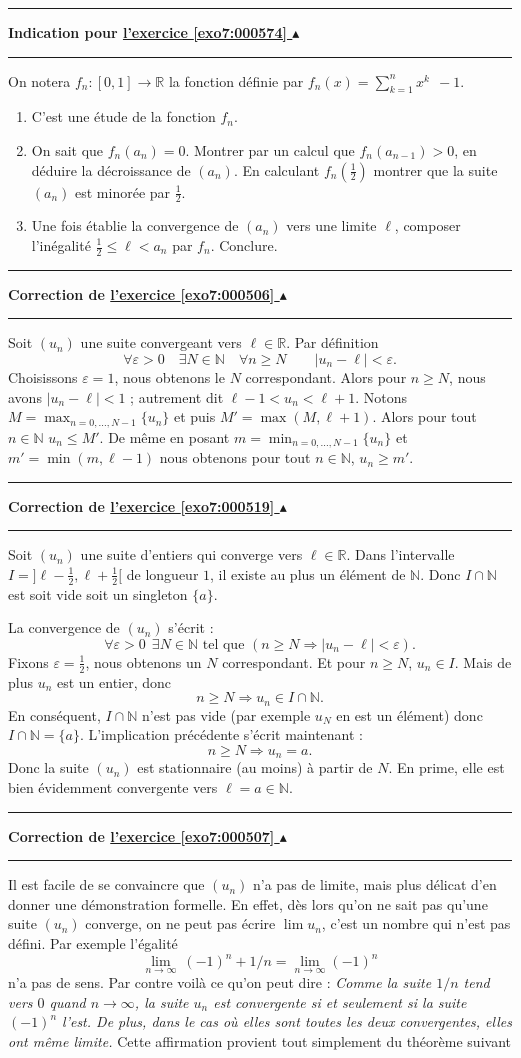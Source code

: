 \documentclass[11pt,a4paper]{article}
\newcommand{\Nn}{\mathbb{N}} \newcommand{\N}{\mathbb{N}}
\newcommand{\Rr}{\mathbb{R}} \newcommand{\R}{\mathbb{R}}
\renewcommand{\epsilon}{\varepsilon}
\newcounter{exo}
\newcommand{\indication}[1]{\hypertarget{ind7:#1}{}\label{ind7:#1}{\bf Indication pour \hyperlink{exo7:#1}{l'exercice \ref{exo7:#1} $\blacktriangle$}}\vspace{1mm}\hrule\vspace{1mm}}
\newcommand{\finindication}{\vspace{1mm}\hrule\vspace*{7mm}}
\newcommand{\correction}[1]{\hypertarget{cor7:#1}{}\label{cor7:#1}{\bf Correction de \hyperlink{exo7:#1}{l'exercice \ref{exo7:#1} $\blacktriangle$}}\vspace{1mm}\hrule\vspace{1mm}}
\newcommand{\fincorrection}{\vspace{1mm}\hrule\vspace*{7mm}}
\begin{document}
\finindication
\indication{000574}
On notera  $f_n : [0,1] \longrightarrow \Rr$ la fonction
d\'efinie par $ f_n(x) = \sum_{k=1}^n x^k \ \ - 1.$
\begin{enumerate}
    \item C'est une \'etude de la fonction $f_n$.
    \item On sait que $f_n(a_n)=0$. Montrer par un calcul que $f_n(a_{n-1}) > 0$,
en d\'eduire la d\'ecroissance de $(a_n)$. En calculant $f_n(\frac 12)$ montrer que 
la suite  $(a_n)$ est minor\'ee par $\frac 12$.
    \item Une fois \'etablie la convergence de  $(a_n)$ vers une limite $\ell$,
composer l'in\'egalit\'e $ \frac 12 \leqslant \ell < a_n$ par $f_n$. Conclure.
\end{enumerate}
\finindication


\newpage

\correction{000506}
Soit $(u_n)$ une suite convergeant vers $\ell \in \Rr$. Par
d\'efinition
$$\forall \epsilon > 0 \quad \exists N \in \Nn \quad  \forall n\geqslant N \qquad |u_n-\ell| < \epsilon.$$
Choisissons $\epsilon = 1$, nous obtenons le  $N$ correspondant.
Alors pour $n\geqslant N$, nous avons $|u_n-\ell| < 1$ ; 
autrement dit $\ell -1 <
u_n < \ell + 1$. Notons $M = \max_{n=0,\ldots,N-1}  \{u_n\}$  et
puis $ M' = \max (M,\ell+1)$. Alors  pour tout $n \in \Nn$ $u_n
\leq M'$. De m\^eme en posant $m = \min_{n=0,\ldots,N-1} \{u_n\}$ et
$m' = \min(m,\ell -1)$ nous obtenons pour tout $n\in \Nn$, $u_n
\geq m'$.
\fincorrection
\correction{000519}
Soit $(u_n)$ une suite d'entiers qui converge vers $\ell \in
\Rr$.
Dans l'intervalle $I = ] \ell - \frac12, \ell +\frac12[$ de
longueur $1$, il existe au plus un \'el\'ement de $\Nn$. Donc $I \cap
\Nn$ est soit vide soit un singleton $\{a \}$.

La convergence de  $(u_n)$ s'\'ecrit :
$$ \forall \epsilon > 0 \ \ \exists N \in \Nn \text{\  \ tel que\ \  }
(n \geqslant N \Rightarrow |u_n-\ell| < \epsilon).$$ Fixons $\epsilon =
\frac 12$, nous obtenons un $N$ correspondant. Et pour $n \geqslant N$,
$u_n \in I$. Mais de plus $u_n$ est un entier, donc
  $$ n \geqslant N \Rightarrow u_n \in I \cap \Nn.$$
En cons\'equent, $I\cap \Nn$ n'est pas vide (par exemple $u_N$ en
est un \'el\'ement) donc $I \cap \Nn = \{ a \}$. L'implication
pr\'ec\'edente s'\'ecrit maintenant :
$$ n \geqslant N \Rightarrow u_n = a.$$
Donc la suite $(u_n)$ est stationnaire (au moins) \`a partir de
$N$. En prime, elle est bien \'evidemment convergente vers $\ell = a
\in \Nn$.
\fincorrection
\correction{000507}
Il est facile de se convaincre que $(u_n)$ n'a pas de
 limite, mais plus délicat d'en donner une d\'emonstration
 formelle. En effet, d\`es lors qu'on ne sait pas qu'une suite $(u_n)$
converge, on ne peut pas \'ecrire $\lim u_n$, c'est un nombre qui
n'est pas d\'efini. Par exemple l'\'egalit\'e $$\lim_{n \rightarrow
\infty}\: (-1)^n+1/n=\lim_{n\rightarrow \infty} (-1)^n$$ n'a pas de
sens. Par contre voil\`a ce qu'on peut dire : \emph{Comme la
suite $1/n$ tend vers $0$ quand $n \rightarrow \infty$, la suite $u_n$ est
convergente si et seulement si la suite $(-1)^n$ l'est. De plus,
dans le cas o\`u elles sont toutes les deux convergentes, elles
ont m\^eme limite.} Cette affirmation provient tout simplement du
th\'eor\`eme suivant
\end{document}
